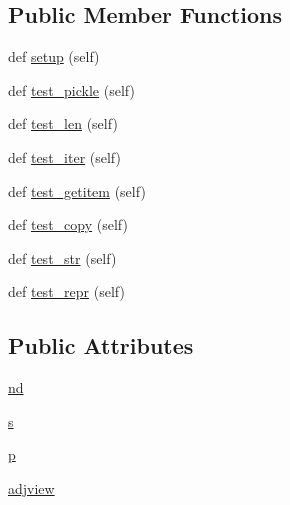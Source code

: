 \subsection*{Public Member Functions}
\begin{DoxyCompactItemize}
\item 
def \hyperlink{classnetworkx_1_1classes_1_1tests_1_1test__coreviews_1_1TestUnionAdjacency_a476b42cb6174c97aa4a35bfabc7ce78a}{setup} (self)
\item 
def \hyperlink{classnetworkx_1_1classes_1_1tests_1_1test__coreviews_1_1TestUnionAdjacency_a3e017cb1c050fd98252c781ab9ca387f}{test\+\_\+pickle} (self)
\item 
def \hyperlink{classnetworkx_1_1classes_1_1tests_1_1test__coreviews_1_1TestUnionAdjacency_a8049cfd7f3a3103b88021ca002cde7ec}{test\+\_\+len} (self)
\item 
def \hyperlink{classnetworkx_1_1classes_1_1tests_1_1test__coreviews_1_1TestUnionAdjacency_a55123c5714fd71d8a7822b0132b7ce34}{test\+\_\+iter} (self)
\item 
def \hyperlink{classnetworkx_1_1classes_1_1tests_1_1test__coreviews_1_1TestUnionAdjacency_a96dff38bf9f2ea8bcdbb3f4b0daffb51}{test\+\_\+getitem} (self)
\item 
def \hyperlink{classnetworkx_1_1classes_1_1tests_1_1test__coreviews_1_1TestUnionAdjacency_a89dafe87d4f76020ab8b532ac347a4ea}{test\+\_\+copy} (self)
\item 
def \hyperlink{classnetworkx_1_1classes_1_1tests_1_1test__coreviews_1_1TestUnionAdjacency_a7e40c303cd745c77b26c1fab53404cac}{test\+\_\+str} (self)
\item 
def \hyperlink{classnetworkx_1_1classes_1_1tests_1_1test__coreviews_1_1TestUnionAdjacency_ab75bcad05f691c0a81db57d28c3fe8a0}{test\+\_\+repr} (self)
\end{DoxyCompactItemize}
\subsection*{Public Attributes}
\begin{DoxyCompactItemize}
\item 
\hyperlink{classnetworkx_1_1classes_1_1tests_1_1test__coreviews_1_1TestUnionAdjacency_a6f0f5e59985234a256cfcebe94ecb29b}{nd}
\item 
\hyperlink{classnetworkx_1_1classes_1_1tests_1_1test__coreviews_1_1TestUnionAdjacency_ab421ea6bc86da5c1175847a1ba8c5169}{s}
\item 
\hyperlink{classnetworkx_1_1classes_1_1tests_1_1test__coreviews_1_1TestUnionAdjacency_ae8b0d04b4575fe865dc0711dea2472d9}{p}
\item 
\hyperlink{classnetworkx_1_1classes_1_1tests_1_1test__coreviews_1_1TestUnionAdjacency_aaf303d57e45431f07932400ccceb4fb4}{adjview}
\end{DoxyCompactItemize}


